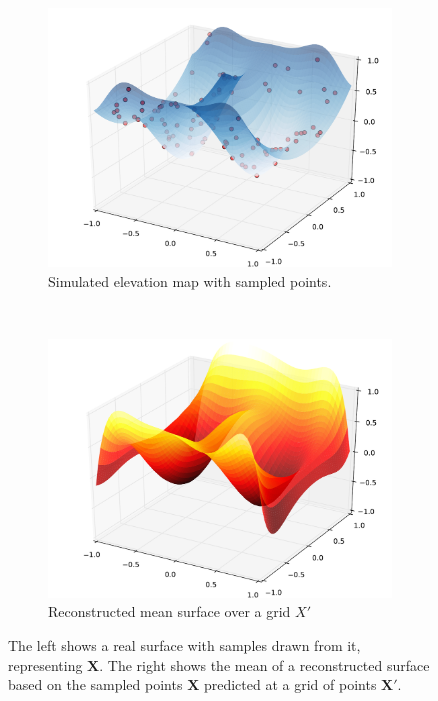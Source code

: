 \documentclass{article} %
\begin{document}
\begin{figure}
        \centering
        \begin{subfigure}[b]{0.5\textwidth}
                \centering
                \includegraphics[width=\textwidth]{2DGaussianProcess1.pdf}
                \caption{Simulated elevation map with sampled points.}
                \label{fig:elevation}
        \end{subfigure}%
        ~ %
        \begin{subfigure}[b]{0.5\textwidth}
                \centering
                \includegraphics[width=\textwidth]{2DGaussianProcess2.pdf}
                \caption{Reconstructed mean surface over a grid $X'$}
                \label{fig:mean}
        \end{subfigure}
        \caption{The left shows a real surface with samples drawn from it, representing $\mathbf{X}$. The right shows the mean of a reconstructed surface based on the sampled points $\mathbf{X}$ predicted at a grid of points $\mathbf{X'}$.}\label{fig:GP}
\end{figure}
\end{document}
